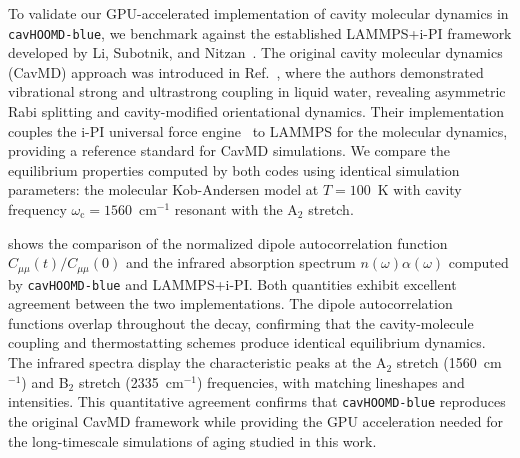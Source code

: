 To validate our GPU-accelerated implementation of cavity molecular dynamics in \texttt{cavHOOMD-blue}, we benchmark against the established LAMMPS+i-PI framework developed by Li, Subotnik, and Nitzan~\cite{li2020cavity}. The original cavity molecular dynamics (CavMD) approach was introduced in Ref.~\cite{li2020cavity}, where the authors demonstrated vibrational strong and ultrastrong coupling in liquid water, revealing asymmetric Rabi splitting and cavity-modified orientational dynamics. Their implementation couples the i-PI universal force engine~\cite{ipi2014} to LAMMPS for the molecular dynamics, providing a reference standard for CavMD simulations. We compare the equilibrium properties computed by both codes using identical simulation parameters: the molecular Kob-Andersen model at $T = 100$~K with cavity frequency $\omega_\mathrm{c} = 1560$~cm$^{-1}$ resonant with the A$_2$ stretch.

 shows the comparison of the normalized dipole autocorrelation function $C_{\mu\mu}(t)/C_{\mu\mu}(0)$ and the infrared absorption spectrum $n(\omega)\alpha(\omega)$ computed by \texttt{cavHOOMD-blue} and LAMMPS+i-PI. Both quantities exhibit excellent agreement between the two implementations. The dipole autocorrelation functions overlap throughout the decay, confirming that the cavity-molecule coupling and thermostatting schemes produce identical equilibrium dynamics. The infrared spectra display the characteristic peaks at the A$_2$ stretch (1560~cm$^{-1}$) and B$_2$ stretch (2335~cm$^{-1}$) frequencies, with matching lineshapes and intensities. This quantitative agreement confirms that \texttt{cavHOOMD-blue} reproduces the original CavMD framework while providing the GPU acceleration needed for the long-timescale simulations of aging studied in this work.
